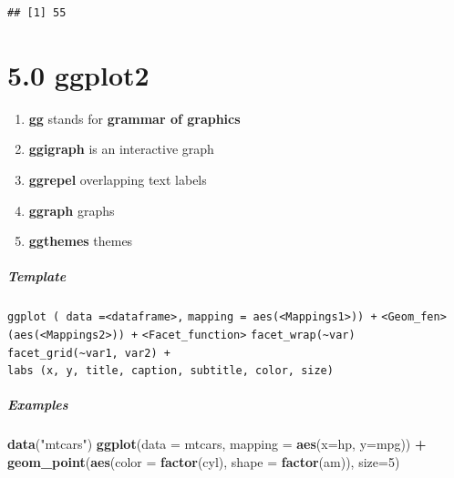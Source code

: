 \documentclass[]{article}
\newenvironment{Shaded}{\begin{snugshade}}{\end{snugshade}}
\newcommand{\KeywordTok}[1]{\textcolor[rgb]{0.13,0.29,0.53}{\textbf{#1}}}
\newcommand{\DataTypeTok}[1]{\textcolor[rgb]{0.13,0.29,0.53}{#1}}
\newcommand{\DecValTok}[1]{\textcolor[rgb]{0.00,0.00,0.81}{#1}}
\newcommand{\StringTok}[1]{\textcolor[rgb]{0.31,0.60,0.02}{#1}}
\newcommand{\OperatorTok}[1]{\textcolor[rgb]{0.81,0.36,0.00}{\textbf{#1}}}
\newcommand{\NormalTok}[1]{#1}
\providecommand{\tightlist}{%
  \setlength{\itemsep}{0pt}\setlength{\parskip}{0pt}}
\let\oldsubparagraph\subparagraph
\renewcommand{\subparagraph}[1]{\oldsubparagraph{#1}\mbox{}}
\begin{document}
\begin{verbatim}
## [1] 55
\end{verbatim}

\section{5.0 ggplot2}\label{ggplot2}

\begin{enumerate}
\def\labelenumi{\arabic{enumi}.}
\tightlist
\item
  \textbf{gg} stands for \textbf{grammar of graphics}
\item
  \textbf{ggigraph} is an interactive graph
\item
  \textbf{ggrepel} overlapping text labels
\item
  \textbf{ggraph} graphs
\item
  \textbf{ggthemes} themes
\end{enumerate}

\subparagraph{Template}\label{template}

\texttt{ggplot\ (\ data\ =\textless{}dataframe\textgreater{},}
\texttt{mapping\ =\ aes(\textless{}Mappings1\textgreater{}))\ +}
\texttt{\textless{}Geom\_fen\textgreater{}(aes(\textless{}Mappings2\textgreater{}))\ +}
\texttt{\textless{}Facet\_function\textgreater{}}
\texttt{facet\_wrap(\textasciitilde{}var)}
\texttt{facet\_grid(\textasciitilde{}var1,\ var2)\ +}
\texttt{labs\ (x,\ y,\ title,\ caption,\ subtitle,\ color,\ size)}

\subparagraph{Examples}\label{examples}

\begin{Shaded}
\begin{Highlighting}[]
\KeywordTok{data}\NormalTok{(}\StringTok{"mtcars"}\NormalTok{)}
\KeywordTok{ggplot}\NormalTok{(}\DataTypeTok{data =}\NormalTok{ mtcars,}
       \DataTypeTok{mapping =} \KeywordTok{aes}\NormalTok{(}\DataTypeTok{x=}\NormalTok{hp, }\DataTypeTok{y=}\NormalTok{mpg)) }\OperatorTok{+}
\StringTok{  }\KeywordTok{geom_point}\NormalTok{(}\KeywordTok{aes}\NormalTok{(}\DataTypeTok{color =} \KeywordTok{factor}\NormalTok{(cyl),}
                 \DataTypeTok{shape =} \KeywordTok{factor}\NormalTok{(am)),}
             \DataTypeTok{size=}\DecValTok{5}\NormalTok{)}
\end{Highlighting}
\end{Shaded}
\end{document}

